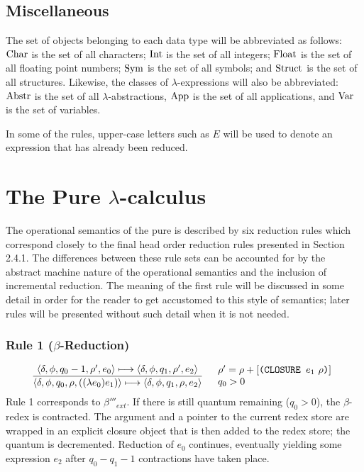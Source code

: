 \subsection{Miscellaneous}

The set of objects belonging to each data type will be abbreviated as follows:
\(\operatorname{Char}\) is the set of all characters; \(\operatorname{Int}\) is the set of all integers;
\(\operatorname{Float}\) is the set of all floating point numbers; \(\operatorname{Sym}\) is the set of all
symbols; and \(\operatorname{Struct}\) is the set of all structures. Likewise, the classes of
\(\lambda\)-expressions will also be abbreviated: \(\operatorname{Abstr}\) is the set of all
\(\lambda\)-abstractions, \(\operatorname{App}\) is the set of all applications, and \(\operatorname{Var}\)
is the set of variables.

In some of the rules, upper-case letters such as \(E\) will be used to denote an
expression that has already been reduced.

\section{The Pure \(\lambda\)-calculus}

The operational semantics of the pure \lambdacalculus{} is described by six
reduction rules which correspond closely to the final head order reduction rules
presented in Section 2.4.1. The differences between these rule sets can be
accounted for by the abstract machine nature of the operational semantics and
the inclusion of incremental reduction. The meaning of the first rule will be
discussed in some detail in order for the reader to get accustomed to this style
of semantics; later rules will be presented without such detail when it is not
needed.

\subsubsection*{Rule 1 (\(\beta\)-Reduction)}
\[
\frac{
  \langle \delta,\phi,q_0-1,\rho',e_0\rangle\longmapsto
  \langle \delta,\phi,q_1,\rho',e_2\rangle
}{
  \langle \delta,\phi,q_0,\rho,((\lambda e_0)e_1)\rangle\longmapsto
  \langle \delta,\phi,q_1,\rho,e_2\rangle
}
\quad
\begin{array}{l}
\rho'=\rho+[\texttt{(CLOSURE }e_1\ \rho\texttt{)}]\\
q_0>0
\end{array}
\]
Rule 1 corresponds to \(\beta'''_{ext}\). If there is still quantum remaining
(\(q_0>0\)), the \(\beta\)-redex is contracted. The argument and a pointer to
the current redex store are wrapped in an explicit closure object that is then
added to the redex store; the quantum is decremented. Reduction of \(e_0\)
continues, eventually yielding some expression \(e_2\) after
\(q_0-q_1-1\) contractions have taken place.

